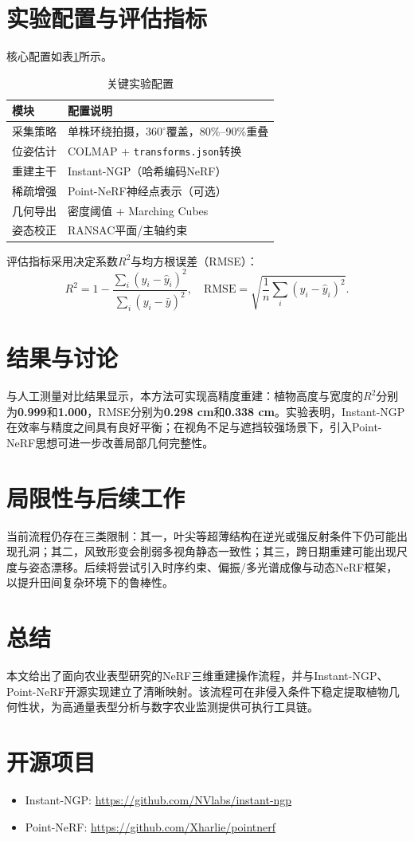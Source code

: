 \documentclass[12pt,a4paper,fontset=fandol]{ctexart}
\begin{document}
\section{实验配置与评估指标}
核心配置如表\ref{tab:config}所示。

\begin{table}[h]
\centering
\caption{关键实验配置}
\label{tab:config}
\begin{tabular}{ll}
\toprule
模块 & 配置说明 \\
\midrule
采集策略 & 单株环绕拍摄，$360^\circ$覆盖，80\%--90\%重叠 \\
位姿估计 & COLMAP + \texttt{transforms.json}转换 \\
重建主干 & Instant-NGP（哈希编码NeRF） \\
稀疏增强 & Point-NeRF神经点表示（可选） \\
几何导出 & 密度阈值 + Marching Cubes \\
姿态校正 & RANSAC平面/主轴约束 \\
\bottomrule
\end{tabular}
\end{table}

评估指标采用决定系数$R^2$与均方根误差（RMSE）：
\[
R^2 = 1 - \frac{\sum_i (y_i - \hat{y}_i)^2}{\sum_i (y_i - \bar{y})^2}, \quad
\mathrm{RMSE} = \sqrt{\frac{1}{n}\sum_i (y_i - \hat{y}_i)^2 }.
\]

\section{结果与讨论}
与人工测量对比结果显示，本方法可实现高精度重建：植物高度与宽度的$R^2$分别为\textbf{0.999}和\textbf{1.000}，RMSE分别为\textbf{0.298 cm}和\textbf{0.338 cm}。实验表明，Instant-NGP在效率与精度之间具有良好平衡；在视角不足与遮挡较强场景下，引入Point-NeRF思想可进一步改善局部几何完整性。

\section{局限性与后续工作}
当前流程仍存在三类限制：其一，叶尖等超薄结构在逆光或强反射条件下仍可能出现孔洞；其二，风致形变会削弱多视角静态一致性；其三，跨日期重建可能出现尺度与姿态漂移。后续将尝试引入时序约束、偏振/多光谱成像与动态NeRF框架，以提升田间复杂环境下的鲁棒性。

\section{总结}
本文给出了面向农业表型研究的NeRF三维重建操作流程，并与Instant-NGP、Point-NeRF开源实现建立了清晰映射。该流程可在非侵入条件下稳定提取植物几何性状，为高通量表型分析与数字农业监测提供可执行工具链。

\section*{开源项目}
\begin{itemize}
  \item Instant-NGP: \url{https://github.com/NVlabs/instant-ngp}
  \item Point-NeRF: \url{https://github.com/Xharlie/pointnerf}
\end{itemize}
\end{document}
